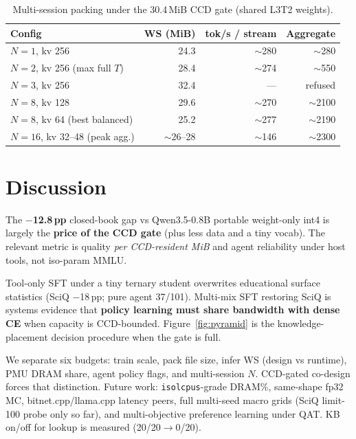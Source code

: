 \documentclass[11pt,a4paper]{article}
\begin{document}
\begin{table}[H]
\centering
\caption{Multi-session packing under the 30.4\,MiB CCD gate (shared L3T2 weights).}
\label{tab:multi}
\small
\begin{tabular}{@{}lrrr@{}}
\toprule
Config & WS (MiB) & tok/s / stream & Aggregate \\
\midrule
$N{=}1$, kv 256 & 24.3 & $\sim$280 & $\sim$280 \\
$N{=}2$, kv 256 (max full $T$) & 28.4 & $\sim$274 & $\sim$550 \\
$N{=}3$, kv 256 & 32.4 & --- & refused \\
$N{=}8$, kv 128 & 29.6 & $\sim$270 & $\sim$2100 \\
$N{=}8$, kv 64 (best balanced) & 25.2 & $\sim$277 & $\sim$2190 \\
$N{=}16$, kv 32--48 (peak agg.) & $\sim$26--28 & $\sim$146 & $\sim$2300 \\
\bottomrule
\end{tabular}
\end{table}

\FloatBarrier
\section{Discussion}
\label{sec:disc}

The \textbf{$-$12.8\,pp} closed-book gap vs Qwen3.5-0.8B portable weight-only int4 is largely the \textbf{price of the CCD gate} (plus less data and a tiny vocab).
The relevant metric is quality \emph{per CCD-resident MiB} and agent reliability under host tools, not iso-param MMLU.

Tool-only SFT under a tiny ternary student overwrites educational surface statistics (SciQ $-$18\,pp; pure agent 37/101).
Multi-mix SFT restoring SciQ is systems evidence that \textbf{policy learning must share bandwidth with dense CE} when capacity is CCD-bounded.
Figure~\ref{fig:pyramid} is the knowledge-placement decision procedure when the gate is full.

We separate six budgets: train scale, pack file size, infer WS (design vs runtime), PMU DRAM share, agent policy flags, and multi-session $N$.
CCD-gated co-design forces that distinction.
Future work: \texttt{isolcpus}-grade DRAM\%, same-shape fp32 MC, bitnet.cpp/llama.cpp latency peers, full multi-seed macro grids (SciQ limit-100 probe only so far), and multi-objective preference learning under QAT. KB on/off for lookup is measured (20/20$\to$0/20).
\end{document}
